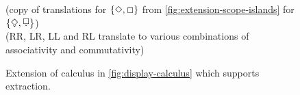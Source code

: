 \begin{figure}
\begin{mdframed}
    \vspace*{\baselineskip}%
    \begin{pfbox}
    \end{pfbox}
    \begin{pfbox}
    \end{pfbox}
    \\
    \vspace*{\baselineskip}
    \hrulefill
    \\
    \vspace*{\baselineskip}
    (copy of translations for $\{\Diamond,\Box\}$ from
    \autoref{fig:extension-scope-islands} for $\{\diExt,\sqExt\}$)
    \\
    \vspace*{\baselineskip}
    ({RR\diExt}, {LR\diExt}, {LL\diExt} and {RL\diExt} translate to
    various combinations of associativity and commutativity)
    \\
    \vspace*{\baselineskip}
  \end{mdframed}
  \caption{Extension of calculus in \autoref{fig:display-calculus}
    which supports extraction.}
  \label{fig:extension-extraction}
\end{figure}
%
